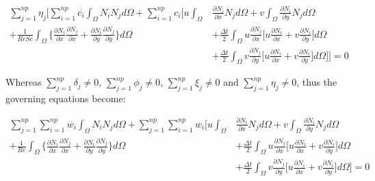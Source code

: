 \begin{equation}
 \begin{aligned} 
  \sum\limits_{j=1}^{np} \eta_j \Bigg[
  \sum\limits_{i=1}^{np} \overset{.}{c_i} \int_{\Omega} N_i N_j d\Omega 
  + \sum\limits_{i=1}^{np} c_i \Bigg[
    u \int_{\Omega} & \frac{\partial N_i}{\partial x} N_j d\Omega 
  + v \int_{\Omega} \frac{\partial N_i}{\partial y} N_j d\Omega 
  \\[5pt]
  + \frac{1}{\textit{ReSc}} \int_{\Omega} \Bigg\{ 
                    \frac{\partial N_i}{\partial x} 
                    \frac{\partial N_j}{\partial x} 
  +                 \frac{\partial N_i}{\partial y} 
                    \frac{\partial N_j}{\partial y} 
  \Bigg\} d\Omega 
 & + \frac{\Delta t}{2} \int_{\Omega} u \frac{\partial N_j}{\partial x}
 \Bigg[
   u \frac{\partial N_i}{\partial x}
 + v \frac{\partial N_i}{\partial y}
 \Bigg] d\Omega
 \\[5pt]
 & + \frac{\Delta t}{2} \int_{\Omega} v \frac{\partial N_j}{\partial y}
 \Bigg[
   u \frac{\partial N_i}{\partial x}
 + v \frac{\partial N_i}{\partial y}
 \Bigg] d\Omega
  \Bigg] \Bigg] = 0
 \end{aligned}
\end{equation}


\noindent
Whereas
$\sum\limits_{j=1}^{np} \delta_j \neq 0$,
$\sum\limits_{j=1}^{np} \phi_j \neq 0$, 
$\sum\limits_{j=1}^{np} \xi_j \neq 0$ and
$\sum\limits_{j=1}^{np} \eta_j \neq 0$,
thus the governing equations become:

\begin{equation}
 \begin{aligned} 
  \sum\limits_{j=1}^{np} 
  \sum\limits_{i=1}^{np} \overset{.}{w_i} \int_{\Omega} N_i N_j d\Omega 
  + \sum\limits_{j=1}^{np} 
    \sum\limits_{i=1}^{np} w_i \Bigg[
    u \int_{\Omega} & \frac{\partial N_i}{\partial x} N_j d\Omega 
  + v \int_{\Omega} \frac{\partial N_i}{\partial y} N_j d\Omega
  \\[5pt]
  + \frac{1}{\textit{Re}} \int_{\Omega} \Bigg\{ 
                    \frac{\partial N_i}{\partial x} 
                    \frac{\partial N_j}{\partial x} 
  +                 \frac{\partial N_i}{\partial y} 
                    \frac{\partial N_j}{\partial y} 
  \Bigg\} d\Omega 
 & + \frac{\Delta t}{2} \int_{\Omega} u \frac{\partial N_j}{\partial x}
 \Bigg[
   u \frac{\partial N_i}{\partial x}
 + v \frac{\partial N_i}{\partial y}
 \Bigg] d\Omega
 \\[5pt]
 & + \frac{\Delta t}{2} \int_{\Omega} v \frac{\partial N_j}{\partial y}
 \Bigg[
   u \frac{\partial N_i}{\partial x}
 + v \frac{\partial N_i}{\partial y}
 \Bigg] d\Omega
  \Bigg] = 0
 \end{aligned}
\end{equation}

